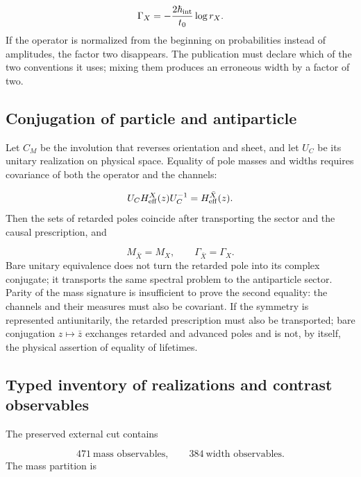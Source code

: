 \[
\Gamma_X=-\frac{2\hbar_{\rm int}}{t_0}\log r_X.
\]
If the operator is normalized from the beginning on probabilities instead of amplitudes, the factor two disappears. The publication must declare which of the two conventions it uses; mixing them produces an erroneous width by a factor of two.

\subsection{Conjugation of particle and antiparticle}
Let \(C_M\) be the involution that reverses orientation and sheet, and let \(U_C\) be its unitary realization on physical space. Equality of pole masses and widths requires covariance of both the operator and the channels:

\[
U_CH_{\rm eff}^{X}(z)U_C^{-1}
=H_{\rm eff}^{\bar X}(z).
\]
Then the sets of retarded poles coincide after transporting the sector and the causal prescription, and

\[
M_{\bar X}=M_X,
\qquad
\Gamma_{\bar X}=\Gamma_X.
\]
Bare unitary equivalence does not turn the retarded pole into its complex conjugate; it transports the same spectral problem to the antiparticle sector. Parity of the mass signature is insufficient to prove the second equality: the channels and their measures must also be covariant. If the symmetry is represented antiunitarily, the retarded prescription must also be transported; bare conjugation \(z\mapsto\bar z\) exchanges retarded and advanced poles and is not, by itself, the physical assertion of equality of lifetimes.

\subsection{Typed inventory of realizations and contrast observables}
The preserved external cut contains

\[
471\ \text{mass observables},
\qquad
384\ \text{width observables}.
\]
The mass partition is

